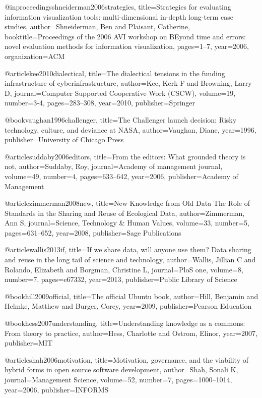 @inproceedings{shneiderman2006strategies,
  title={Strategies for evaluating information visualization tools: multi-dimensional in-depth long-term case studies},
  author={Shneiderman, Ben and Plaisant, Catherine},
  booktitle={Proceedings of the 2006 AVI workshop on BEyond time and errors: novel evaluation methods for information visualization},
  pages={1--7},
  year={2006},
  organization={ACM}
}

@article{kee2010dialectical,
  title={The dialectical tensions in the funding infrastructure of cyberinfrastructure},
  author={Kee, Kerk F and Browning, Larry D},
  journal={Computer Supported Cooperative Work (CSCW)},
  volume={19},
  number={3-4},
  pages={283--308},
  year={2010},
  publisher={Springer}
}


@book{vaughan1996challenger,
  title={The Challenger launch decision: Risky technology, culture, and deviance at NASA},
  author={Vaughan, Diane},
  year={1996},
  publisher={University of Chicago Press}
}

@article{suddaby2006editors,
  title={From the editors: What grounded theory is not},
  author={Suddaby, Roy},
  journal={Academy of management journal},
  volume={49},
  number={4},
  pages={633--642},
  year={2006},
  publisher={Academy of Management}
}


@article{zimmerman2008new,
  title={New Knowledge from Old Data The Role of Standards in the Sharing and Reuse of Ecological Data},
  author={Zimmerman, Ann S},
  journal={Science, Technology \& Human Values},
  volume={33},
  number={5},
  pages={631--652},
  year={2008},
  publisher={Sage Publications}
}

@article{wallis2013if,
  title={If we share data, will anyone use them? Data sharing and reuse in the long tail of science and technology},
  author={Wallis, Jillian C and Rolando, Elizabeth and Borgman, Christine L},
  journal={PloS one},
  volume={8},
  number={7},
  pages={e67332},
  year={2013},
  publisher={Public Library of Science}
}

@book{hill2009official,
  title={The official Ubuntu book},
  author={Hill, Benjamin and Helmke, Matthew and Burger, Corey},
  year={2009},
  publisher={Pearson Education}
}


@book{hess2007understanding,
  title={Understanding knowledge as a commons: From theory to practice},
  author={Hess, Charlotte and Ostrom, Elinor},
  year={2007},
  publisher={MIT}
}


@article{shah2006motivation,
  title={Motivation, governance, and the viability of hybrid forms in open source software development},
  author={Shah, Sonali K},
  journal={Management Science},
  volume={52},
  number={7},
  pages={1000--1014},
  year={2006},
  publisher={INFORMS}
}



